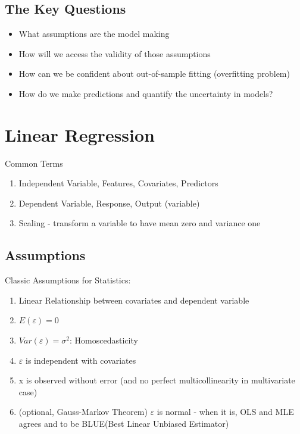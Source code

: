 \documentclass[11pt, openany]{book}              %
\begin{document}
\subsection{The Key Questions}

 \begin{itemize}
 	\item What assumptions are the model making
 	\item How will we access the validity of those assumptions
 	\item How can we be confident about out-of-sample fitting (overfitting problem)
 	\item How do we make predictions and quantify the uncertainty in models?
 \end{itemize}

\section{Linear Regression}

Common Terms

\begin{enumerate}
    \item Independent Variable, Features, Covariates, Predictors
    \item Dependent Variable, Response, Output (variable)
    \item Scaling - transform a variable to have mean zero and variance one
\end{enumerate}

\subsection{Assumptions}
Classic Assumptions for Statistics:
\begin{enumerate}
    \item Linear Relationship between covariates and dependent variable
    \item $E(\varepsilon)=0$
    \item $Var(\varepsilon) =\sigma^2$: Homoscedasticity
    \item $\varepsilon$ is independent with covariates 
    \item x is observed without error (and no perfect multicollinearity in multivariate case)
    \item (optional, Gauss-Markov Theorem) $\varepsilon$ is normal - when it is, OLS and MLE agrees and to be BLUE(Best Linear Unbiased Estimator)
\end{enumerate}
\end{document}

